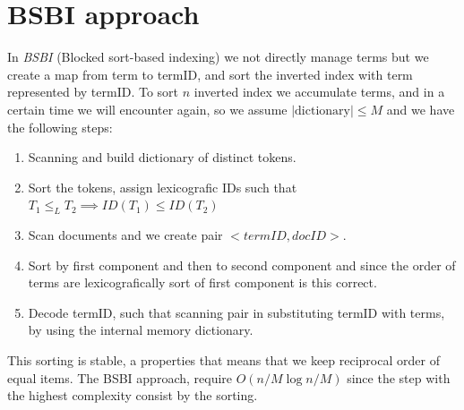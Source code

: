 \section{BSBI approach}
In \emph{BSBI} (Blocked sort-based indexing) we not directly manage terms but we create a map from term to termID,
and sort the inverted index with term represented by termID.\newline
To sort $n$ inverted index we accumulate terms, and in a certain time we will encounter again, so we 
assume $|\text{dictionary}| \leq M$ and we have the following steps:
\begin{enumerate}
    \item Scanning and build dictionary of distinct tokens.
    \item Sort the tokens, assign lexicografic IDs such that $T_1 \leq_L T_2 \implies ID(T_1) \leq ID(T_2)$
    \item Scan documents and we create pair $<term ID, docID>$.
    \item Sort by first component and then to second component and since the order of terms are 
	  lexicografically sort of first component is this correct.
    \item Decode termID, such that scanning pair in substituting termID with terms, by using the internal
	  memory dictionary.
\end{enumerate}
This sorting is stable, a properties that means that we keep reciprocal order of equal items.\newline
The BSBI approach, require $O(n/M \log n/M)$ since the step with the highest complexity consist by the sorting.


